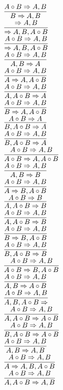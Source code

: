 \documentclass[11pt]{article}
\begin{document}
\begin{center}
\bigskip
\\$\infer{B\Rightarrow A, B}{A\circ B\Rightarrow A, B}$
\bigskip
\\$\infer{\Rightarrow A, B, A\circ B}{\Rightarrow A, B}$
\bigskip
\\$\infer{\Rightarrow A, B, A\circ B}{A\circ B\Rightarrow A, B}$
\bigskip
\\$\infer{A, B\Rightarrow A}{A\circ B\Rightarrow A, B}$
\bigskip
\\$\infer{A\Rightarrow A, A\circ B}{A\circ B\Rightarrow A, B}$
\bigskip
\\$\infer{A, A\circ B\Rightarrow A}{A\circ B\Rightarrow A, B}$
\bigskip
\\$\infer{B\Rightarrow A, A\circ B}{A\circ B\Rightarrow A, B}$
\bigskip
\\$\infer{B, A\circ B\Rightarrow A}{A\circ B\Rightarrow A}$
\bigskip
\\$\infer{B, A\circ B\Rightarrow A}{A\circ B\Rightarrow A, B}$
\bigskip
\\$\infer{A\circ B\Rightarrow A, A\circ B}{A\circ B\Rightarrow A, B}$
\bigskip
\\$\infer{A, B\Rightarrow B}{A\circ B\Rightarrow A, B}$
\bigskip
\\$\infer{A\Rightarrow B, A\circ B}{A\circ B\Rightarrow A, B}$
\bigskip
\\$\infer{A, A\circ B\Rightarrow B}{A\circ B\Rightarrow B}$
\bigskip
\\$\infer{A, A\circ B\Rightarrow B}{A\circ B\Rightarrow A, B}$
\bigskip
\\$\infer{B\Rightarrow B, A\circ B}{A\circ B\Rightarrow A, B}$
\bigskip
\\$\infer{B, A\circ B\Rightarrow B}{A\circ B\Rightarrow A, B}$
\bigskip
\\$\infer{A\circ B\Rightarrow B, A\circ B}{A\circ B\Rightarrow A, B}$
\bigskip
\\$\infer{A, B\Rightarrow A\circ B}{A\circ B\Rightarrow A, B}$
\bigskip
\\$\infer{A, B, A\circ B\Rightarrow }{A\circ B\Rightarrow A, B}$
\bigskip
\\$\infer{A, A\circ B\Rightarrow A\circ B}{A\circ B\Rightarrow A, B}$
\bigskip
\\$\infer{B, A\circ B\Rightarrow A\circ B}{A\circ B\Rightarrow A, B}$
\bigskip
\\$\infer{A, B\Rightarrow A, B}{A\circ B\Rightarrow A, B}$
\bigskip
\\$\infer{A\Rightarrow A, B, A\circ B}{A\circ B\Rightarrow A, B}$
\bigskip
\\$\infer{A, A\circ B\Rightarrow A, B}{A\circ B\Rightarrow A, B}$

\end{center}
\end{document}
